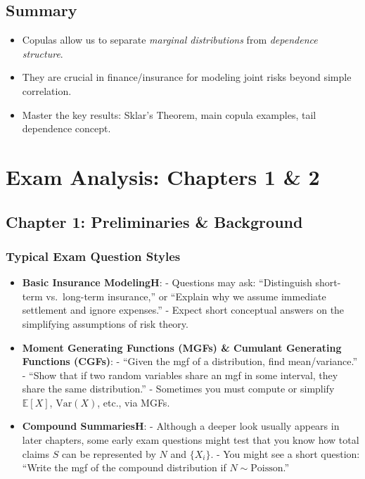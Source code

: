\documentclass[13pt,a4paper]{article}
\begin{document}
\subsection{Summary}
\begin{itemize}
  \item Copulas allow us to separate \emph{marginal distributions} from \emph{dependence structure}.
  \item They are crucial in finance/insurance for modeling joint risks beyond simple correlation.
  \item Master the key results: Sklar's Theorem, main copula examples, tail dependence concept.
\end{itemize}


\section{Exam Analysis: Chapters 1 \& 2}
\label{sec:chap1-2_exam_analysis}

\subsection{Chapter 1: Preliminaries \& Background}

\subsubsection{Typical Exam Question Styles}
\begin{itemize}
  \item \textbf{Basic Insurance ModelingH}: 
    - Questions may ask: “Distinguish short-term vs.\ long-term insurance,” or “Explain why we assume immediate settlement and ignore expenses.”  
    - Expect short conceptual answers on the simplifying assumptions of risk theory.
  \item \textbf{Moment Generating Functions (MGFs) \& Cumulant Generating Functions (CGFs)}: 
    - “Given the mgf of a distribution, find mean/variance.”  
    - “Show that if two random variables share an mgf in some interval, they share the same distribution.”  
    - Sometimes you must compute or simplify \(\mathbb{E}[X]\), \(\mathrm{Var}(X)\), etc., via MGFs.
  \item \textbf{Compound SummariesH}: 
    - Although a deeper look usually appears in later chapters, some early exam questions might test that you know how total claims \(S\) can be represented by \(N\) and \(\{X_i\}\).  
    - You might see a short question: “Write the mgf of the compound distribution if \(N\sim\text{Poisson}\).”
\end{itemize}
\end{document}

